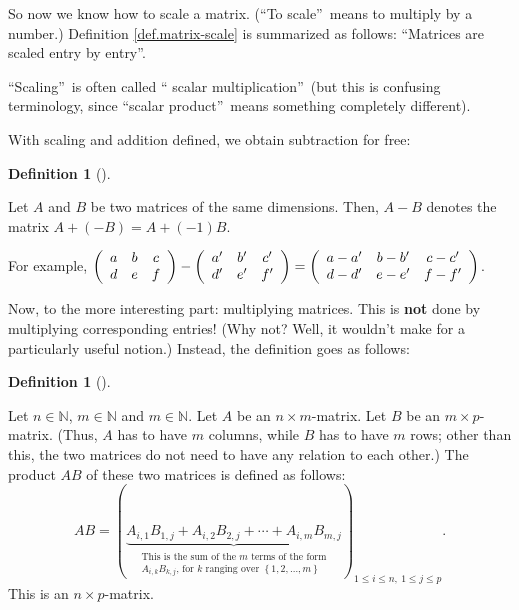 \documentclass[numbers=enddot,12pt,final,onecolumn,notitlepage]{scrartcl}%
\theoremstyle{definition}
\newtheorem{defi}[theo]{Definition}
\newenvironment{definition}[1][]
{\begin{defi}[#1]\begin{leftbar}}
{\end{leftbar}\end{defi}}
\begin{document}
So now we know how to scale a matrix. (\textquotedblleft To
scale\textquotedblright\ means to multiply by a number.) Definition
\ref{def.matrix-scale} is summarized as follows: \textquotedblleft Matrices
are scaled entry by entry\textquotedblright.

\textquotedblleft Scaling\textquotedblright\ is often called \textquotedblleft
scalar multiplication\textquotedblright\ (but this is confusing terminology,
since \textquotedblleft scalar product\textquotedblright\ means something
completely different).

With scaling and addition defined, we obtain subtraction for free:

\begin{definition}
\label{def.matrix-diff}Let $A$ and $B$ be two matrices of the same dimensions.
Then, $A-B$ denotes the matrix $A+\left(  -B\right)  =A+\left(  -1\right)  B$.
\end{definition}

For example, $\left(
\begin{array}
[c]{ccc}%
a & b & c\\
d & e & f
\end{array}
\right)  -\left(
\begin{array}
[c]{ccc}%
a^{\prime} & b^{\prime} & c^{\prime}\\
d^{\prime} & e^{\prime} & f^{\prime}%
\end{array}
\right)  =\left(
\begin{array}
[c]{ccc}%
a-a^{\prime} & b-b^{\prime} & c-c^{\prime}\\
d-d^{\prime} & e-e^{\prime} & f-f^{\prime}%
\end{array}
\right)  $.

Now, to the more interesting part: multiplying matrices. This is \textbf{not}
done by multiplying corresponding entries! (Why not? Well, it wouldn't make
for a particularly useful notion.) Instead, the definition goes as follows:

\begin{definition}
\label{def.AB}Let $n\in\mathbb{N}$, $m\in\mathbb{N}$ and $m\in\mathbb{N}$. Let
$A$ be an $n\times m$-matrix. Let $B$ be an $m\times p$-matrix. (Thus, $A$ has
to have $m$ columns, while $B$ has to have $m$ rows; other than this, the two
matrices do not need to have any relation to each other.) The product $AB$ of
these two matrices is defined as follows:%
\[
AB=\left(  \underbrace{A_{i,1}B_{1,j}+A_{i,2}B_{2,j}+\cdots+A_{i,m}B_{m,j}%
}_{\substack{\text{This is the sum of the }m\text{ terms of the form}%
\\A_{i,k}B_{k,j}\text{, for }k\text{ ranging over }\left\{  1,2,\ldots
,m\right\}  }}\right)  _{1\leq i\leq n,\ 1\leq j\leq p}.
\]
This is an $n\times p$-matrix.
\end{definition}
\end{document}
